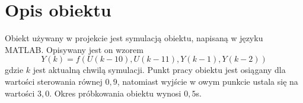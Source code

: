 \chapter{Opis obiektu}
\label{sec:opis}
Obiekt używany w projekcie jest symulacją obiektu, napisaną w języku MATLAB.
Opisywany jest on wzorem
\begin{equation}
  Y(k) = f(U(k - 10), U(k - 11), Y(k - 1), Y(k - 2))
\end{equation}
gdzie $k$ jest aktualną chwilą symulacji.
Punkt pracy obiektu jest osiągany dla wartości sterowania równej $0,9$,
natomiast wyjście w owym punkcie ustala się na wartości $3,0$. Okres próbkowania
obiektu wynosi $0,5$s.
